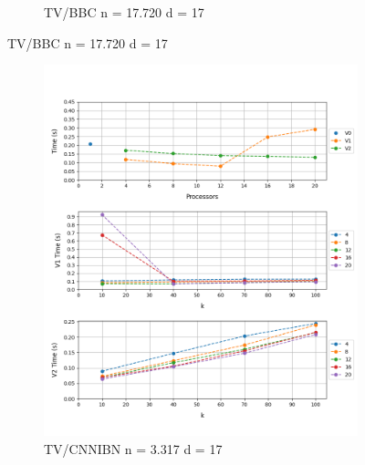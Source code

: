 \documentclass[12pt, a4paper]{article}
\begin{document}
\begin{figure}[h!]
\begin{subfigure}[b]{0.33\textwidth}
         \caption{TV/BBC n = 17.720 d = 17} 
     \end{subfigure}
\end{figure}


\begin{figure}[h!]
     \begin{subfigure}[b]{0.33\textwidth}
         \centering
         \includegraphics[height=.20\textheight, width=\textwidth, keepaspectratio]{assets/tv/cnnibn.png}
    \caption{TV/CNNIBN n = 3.317 d = 17}
     \end{subfigure}
     \hfill
     \begin{subfigure}[b]{0.33\textwidth}
         \centering

\end{subfigure}
\end{figure}
\end{document}
